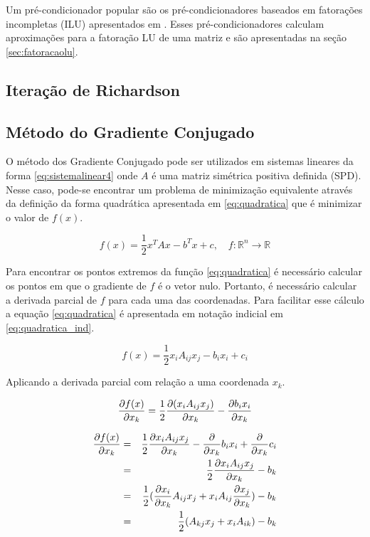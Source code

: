 Um pré-condicionador popular são os pré-condicionadores baseados em fatorações incompletas (ILU) apresentados em \citet{ilupaper}. Esses pré-condicionadores calculam aproximações para a fatoração LU de uma matriz e são apresentadas na seção \ref{sec:fatoracaolu}.

\subsection{Iteração de Richardson}



\subsection{Método do Gradiente Conjugado}

O método dos Gradiente Conjugado pode ser utilizados em sistemas lineares da forma \eqref{eq:sistemalinear4} onde $A$ é uma matriz simétrica positiva definida (SPD). Nesse caso, pode-se encontrar um problema de minimização equivalente através da definição da forma quadrática apresentada em \eqref{eq:quadratica} que é minimizar o valor de $f(x)$. 

\begin{equation} \label{eq:quadratica}
    f(x) = \frac{1}{2}  x^T A x - b^T x + c, \quad f:\mathbb{R}^n \rightarrow \mathbb{R}
\end{equation}

Para encontrar os pontos extremos da função \eqref{eq:quadratica} é necessário calcular os pontos em que o gradiente de $f$ é o vetor nulo. Portanto, é necessário calcular a derivada parcial de $f$ para cada uma das coordenadas. Para facilitar esse cálculo a equação \ref{eq:quadratica} é apresentada em notação indicial em \eqref{eq:quadratica_ind}.


\begin{equation} \label{eq:quadratica_ind}
    f(x) = \frac{1}{2} x_i A_{ij} x_j - b_i x_i + c_i
\end{equation}


Aplicando a derivada parcial com relação a uma coordenada $x_k$.

\begin{equation}
    \dxk[f(x)] = \frac{1}{2}  \dxk[ (x_i A_{ij} x_j) ]- \dxk[b_i x_i]
\end{equation}

\begin{eqnarray}
     \dxk[f(x)] & = & \frac{1}{2} \dxk[ x_i A_{ij} x_j ]- \dxk{b_i x_i}+ \dxk{c_i} \\
                & = & \frac{1}{2} \dxk[ x_i A_{ij} x_j ]- b_k \\
                & = & \frac{1}{2} (\dxk[ x_i ]A_{ij} x_j  + x_i A_{ij} \dxk[x_j]) - b_k \\
                & = & \frac{1}{2}(A_{kj} x_j  + x_i A_{ik})  - b_k
\end{eqnarray}


